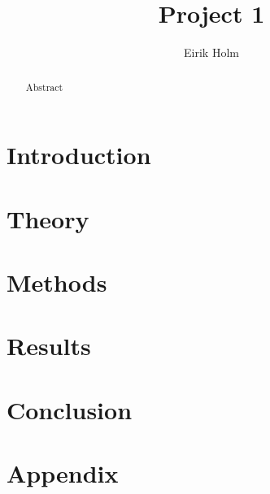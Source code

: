 \documentclass[12pt,a4paper]{article}
\begin{document}
\title{Project 1}

\author{Eirik Holm}

\maketitle

\newpage

\begin{abstract}
    Abstract
\end{abstract}


\tableofcontents


\section{Introduction}

\section{Theory}

\section{Methods}

\section{Results}

\section{Conclusion}

\appendix

\section{Appendix}


\printbibliography
\end{document}
